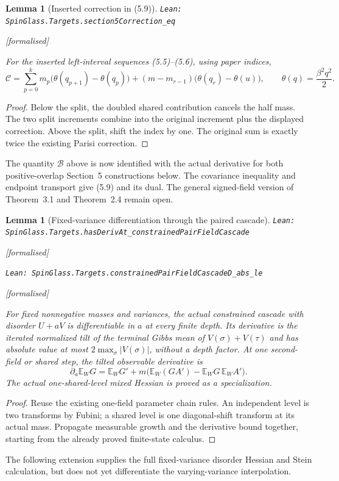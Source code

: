 \documentclass[11pt]{article}
\providecommand{\lean}[1]{\leavevmode\par\nopagebreak
  {\noindent\normalfont\footnotesize\raggedright\texttt{Lean: #1}\par}\nopagebreak}
\providecommand{\leanok}{\par\nopagebreak
  {\noindent\normalfont\footnotesize\textcolor{green!50!black}{[formalised]}\par}\nopagebreak}
\newtheorem{lemma}[theorem]{Lemma}
\begin{document}
\begin{lemma}[Inserted correction in (5.9)]
\lean{SpinGlass.Targets.section5Correction\_eq}\leanok
For the inserted left-interval sequences (5.5)--(5.6), using paper indices,
\[
\mathcal C=\sum_{p=0}^{k}m_p\bigl(\theta(q_{p+1})-\theta(q_p)\bigr)
 +(m-m_{r-1})\bigl(\theta(q_r)-\theta(u)\bigr),\qquad
\theta(q)=\frac{\beta^2q^2}{2}.
\]
\end{lemma}
\begin{proof}
Below the split, the doubled shared contribution cancels the half mass.
The two split increments combine into the original increment plus the
displayed correction. Above the split, shift the index by one. The original
sum is exactly twice the existing Parisi correction.
\end{proof}
The quantity $\mathcal B$ above is now identified with the actual derivative
for both positive-overlap Section~5 constructions below. The covariance
inequality and endpoint transport give (5.9) and its dual. The general
signed-field version of Theorem~3.1 and Theorem~2.4 remain open.

\begin{lemma}[Fixed-variance differentiation through the paired cascade]
\lean{SpinGlass.Targets.hasDerivAt\_constrainedPairFieldCascade}\leanok
\lean{SpinGlass.Targets.constrainedPairFieldCascadeD\_abs\_le}\leanok
For fixed nonnegative masses and variances, the actual constrained cascade
with disorder $U+aV$ is differentiable in $a$ at every finite depth.
Its derivative is the iterated normalized tilt of the terminal Gibbs mean
of $V(\sigma)+V(\tau)$ and has absolute value at most
$2\max_\sigma|V(\sigma)|$, without a depth factor.
At one second-field or shared step, the tilted observable derivative is
\[
 \partial_a\mathbb E_W G
 =\mathbb E_W G'+m\bigl(\mathbb E_W(GA')-\mathbb E_WG\,\mathbb E_WA'\bigr).
\]
The actual one-shared-level mixed Hessian is proved as a specialization.
\end{lemma}
\begin{proof}
Reuse the existing one-field parameter chain rules. An independent level
is two transforms by Fubini; a shared level is one diagonal-shift transform
at its actual mass. Propagate measurable growth and the derivative bound
together, starting from the already proved finite-state calculus.
\end{proof}
The following extension supplies the full fixed-variance disorder Hessian and Stein
calculation, but does not yet differentiate the varying-variance interpolation.
\end{document}

